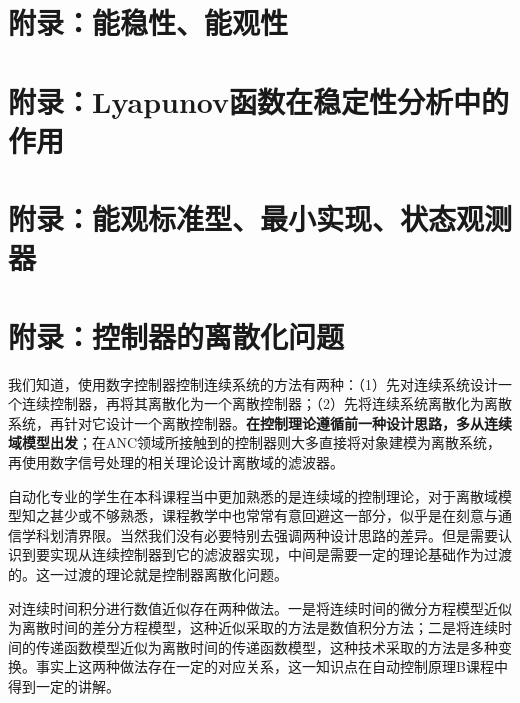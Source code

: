 \documentclass[
  12pt,
  a4paper
]{article}
\begin{document}
\section{附录：能稳性、能观性}\label{ux9644ux5f55ux80fdux7a33ux6027ux80fdux89c2ux6027}

\section{附录：Lyapunov函数在稳定性分析中的作用}\label{ux9644ux5f55lyapunovux51fdux6570ux5728ux7a33ux5b9aux6027ux5206ux6790ux4e2dux7684ux4f5cux7528}

\section{附录：能观标准型、最小实现、状态观测器}\label{ux9644ux5f55ux80fdux89c2ux6807ux51c6ux578bux6700ux5c0fux5b9eux73b0ux72b6ux6001ux89c2ux6d4bux5668}

\section{附录：控制器的离散化问题}\label{ux9644ux5f55ux63a7ux5236ux5668ux7684ux79bbux6563ux5316ux95eeux9898}

我们知道，使用数字控制器控制连续系统的方法有两种：（1）先对连续系统设计一个连续控制器，再将其离散化为一个离散控制器；（2）先将连续系统离散化为离散系统，再针对它设计一个离散控制器。\textbf{在控制理论遵循前一种设计思路，多从连续域模型出发}；在ANC领域所接触到的控制器则大多直接将对象建模为离散系统，再使用数字信号处理的相关理论设计离散域的滤波器。

自动化专业的学生在本科课程当中更加熟悉的是连续域的控制理论，对于离散域模型知之甚少或不够熟悉，课程教学中也常常有意回避这一部分，似乎是在刻意与通信学科划清界限。当然我们没有必要特别去强调两种设计思路的差异。但是需要认识到要实现从连续控制器到它的滤波器实现，中间是需要一定的理论基础作为过渡的。这一过渡的理论就是控制器离散化问题。

对连续时间积分进行数值近似存在两种做法。一是将连续时间的微分方程模型近似为离散时间的差分方程模型，这种近似采取的方法是数值积分方法；二是将连续时间的传递函数模型近似为离散时间的传递函数模型，这种技术采取的方法是多种变换。事实上这两种做法存在一定的对应关系，这一知识点在自动控制原理B课程中得到一定的讲解。
\end{document}
